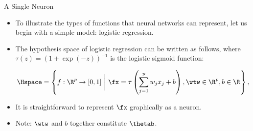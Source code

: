 







\begin{frame} {A Single Neuron}
\begin{itemize}
\item To illustrate the types of functions that neural networks can represent, let us begin with a simple model: logistic regression.
\vspace{5mm}
\item The hypothesis space of logistic regression can be written as follows, where $\tau(z) = (1 + \exp(-z))^{-1}$ is the logistic sigmoid function:\begin{small} $$\Hspace = \left\{f: \R^p \to [0, 1] ~\bigg|~ \fx = \tau\left(\sum_{j = 1}^p w_j x_j + b\right), \wtw \in \R^p, b \in \R \right\},$$ \end{small}
\vspace{3mm}
\item It is straightforward to represent $\fx$ graphically as a neuron.
\vspace{5mm}
\item Note: $\wtw$ and $b$ together constitute $\thetab$.
\end{itemize}
\end{frame}

